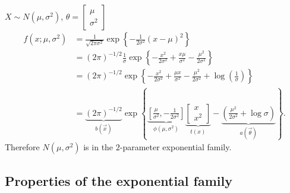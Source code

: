 \documentclass[10pt, a4paper]{article}
\begin{document}
\begin{example}
    $X \sim N(\mu, \sigma ^ 2)$,
    $\theta = \begin{bmatrix}
        \mu \\ \sigma ^ 2
    \end{bmatrix}$
    \begin{align*}
        f(x; \mu, \sigma ^ 2) &= \frac{1}{\sqrt{2\pi\sigma ^ 2}}\exp\left\{-\frac{1}{2\sigma ^ 2}(x - \mu) ^ 2\right\} \\
        &= (2\pi) ^ {-1 / 2}\frac{1}{\sigma}\exp\left\{-\frac{x ^ 2}{2\sigma ^ 2} + \frac{x\mu}{\sigma ^ 2} - \frac{\mu ^ 2}{2\sigma ^ 2}\right\} \\
        &= (2\pi) ^ {-1 / 2}\exp\left\{-\frac{x ^ 2}{2\sigma ^ 2} + \frac{\mu x}{\sigma ^ 2} - \frac{\mu ^ 2}{2\sigma ^ 2} + \log\left(\frac{1}{\sigma}\right)\right\} \\
        &= \underbrace{(2\pi) ^ {-1 / 2}}_{b(\vec{x})}\exp\left\{\underbrace{\left[\frac{\mu}{\sigma ^ 2}, -\frac{1}{2\sigma ^ 2}\right]}_{\phi(\mu, \sigma ^ 2)}\underbrace{\begin{bmatrix}
            x \\ x ^ 2
        \end{bmatrix}}_{t(x)} - \underbrace{\left(\frac{\mu ^ 2}{2\sigma ^ 2} + \log{\sigma}\right)}_{a(\vec{\theta})}\right\}.
    \end{align*}
    Therefore $N(\mu, \sigma ^ 2)$ is in the $2$-parameter exponential family.
\end{example}

\subsection{Properties of the exponential family}
\end{document}
